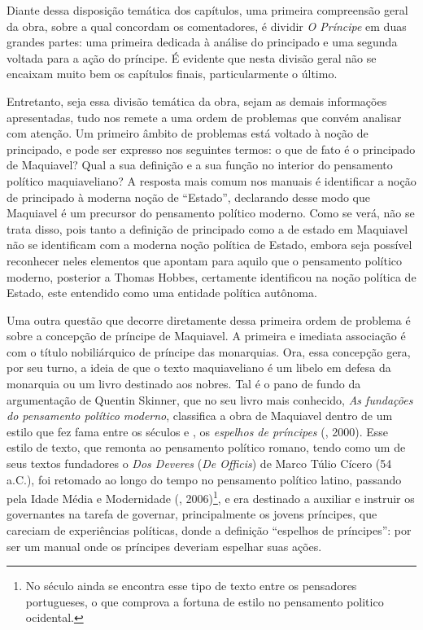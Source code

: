 Diante dessa disposição temática dos capítulos, uma primeira compreensão
geral da obra, sobre a qual concordam os comentadores, é dividir \emph{O
Príncipe} em duas grandes partes: uma primeira dedicada à análise do
principado e uma segunda voltada para a ação do príncipe. É evidente que
nesta divisão geral não se encaixam muito bem os capítulos finais,
particularmente o último.

Entretanto, seja essa divisão temática da obra, sejam as demais
informações apresentadas, tudo nos remete a uma ordem de problemas que
convém analisar com atenção. Um primeiro âmbito de problemas está
voltado à noção de principado, e pode ser expresso nos seguintes termos:
o que de fato é o principado de Maquiavel? Qual a sua definição e a sua
função no interior do pensamento político maquiaveliano? A resposta mais
comum nos manuais é identificar a noção de principado à moderna noção de
``Estado'', declarando desse modo que Maquiavel é um precursor do
pensamento político moderno. Como se verá, não se trata disso, pois
tanto a definição de principado como a de estado em Maquiavel não se
identificam com a moderna noção política de Estado, embora seja possível
reconhecer neles elementos que apontam para aquilo que o pensamento
político moderno, posterior a Thomas Hobbes, certamente identificou na
noção política de Estado, este entendido como uma entidade política
autônoma.

Uma outra questão que decorre diretamente dessa primeira ordem de
problema é sobre a concepção de príncipe de Maquiavel. A primeira e
imediata associação é com o título nobiliárquico de príncipe das
monarquias. Ora, essa concepção gera, por seu turno, a ideia de que o
texto maquiaveliano é um libelo em defesa da monarquia ou um livro
destinado aos nobres. Tal é o pano de fundo da argumentação de Quentin
Skinner, que no seu livro mais conhecido, \emph{As fundações do
pensamento político moderno}, classifica a obra de Maquiavel dentro de
um estilo que fez fama entre os séculos  e , os \emph{espelhos de
príncipes} (, 2000). Esse estilo de texto, que remonta ao
pensamento político romano, tendo como um de seus textos fundadores o
\emph{Dos Deveres} (\emph{De Officis}) de Marco Túlio Cícero (54 a.C.),
foi retomado ao longo do tempo no pensamento político latino, passando
pela Idade Média e Modernidade (, 2006)\footnote{No século
   ainda se encontra esse tipo de texto entre os pensadores
  portugueses, o que comprova a fortuna de estilo no pensamento politico
  ocidental.}, e era destinado a auxiliar e instruir os governantes na
tarefa de governar, principalmente os jovens príncipes, que careciam de
experiências políticas, donde a definição ``espelhos de príncipes'': por
ser um manual onde os príncipes deveriam espelhar suas ações.

